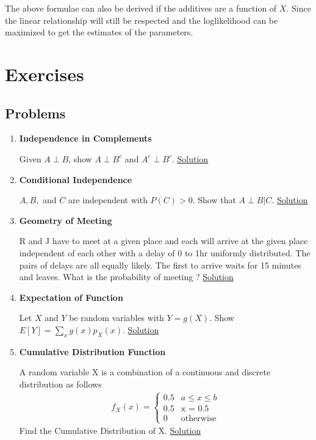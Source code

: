 \documentclass[11pt, a4paper]{article}
\begin{document}
    The above formulae can also be derived if the additives are a function of $X$. Since the linear relationship will still be respected and the loglikelihood can be maximized to get the estimates of the parameters.


    \section{Exercises}
    \subsection{Problems}
    \begin{enumerate}
    \item \hypertarget{q_indcomp}{\textbf{Independence in Complements}}\newline
    Given $A \perp B$, show $A \perp B^{c}$ and $A^{c} \perp B^{c}$. \hyperlink{a_indcomp}{Solution}

    \item \hypertarget{q_conind}{\textbf{Conditional Independence}}\newline
    $A,B,$ and $C$ are independent with $P(C) > 0$. Show that $A\perp B |C$. \hyperlink{a_conind}{Solution}

    \item \hypertarget{q_geomeet}{\textbf{Geometry of Meeting}}\newline
    R and J have to meet at a given place and each will arrive at the given place independent of each other with a delay of 0 to 1hr uniformly distributed. The pairs of delays are all equally likely. The first to arrive waits for 15 minutes and leaves. What is the probability of meeting ? \hyperlink{a_geomeet}{Solution}
    
    \item \hypertarget{q_expfn}{\textbf{Expectation of Function}}\newline
    Let $X$ and $Y$ be random variables with $Y = g(X)$. Show $E[Y] = \sum_{x}g(x)p_{X}(x)$. \hyperlink{a_expfn}{Solution}

    \item \hypertarget{q_cumuldistfn}{\textbf{Cumulative Distribution Function}}\newline
    A random variable X is a combination of a continuous and discrete distribution as follows
    \begin{align*}
        f_{X}(x) = \begin{cases} 0.5 &\mbox{$a \leq x \leq b$}\\
                                 0.5 &\mbox{x = 0.5}\\
                                 0 &\mbox{otherwise} \end{cases}
    \end{align*}
    Find the Cumulative Distribution of X. \hyperlink{a_cumuldistfn}{Solution}
    

\end{enumerate}
\end{document}
